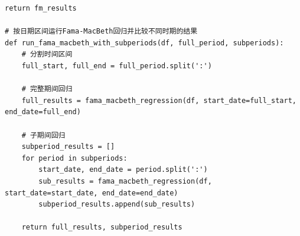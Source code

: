 \documentclass[12pt, a4paper]{article}
\begin{document}
\begin{lstlisting}[basicstyle=\small\ttfamily, breaklines=true, columns=fullflexible]
    return fm_results

# 按日期区间运行Fama-MacBeth回归并比较不同时期的结果
def run_fama_macbeth_with_subperiods(df, full_period, subperiods):
    # 分割时间区间
    full_start, full_end = full_period.split(':')
    
    # 完整期间回归
    full_results = fama_macbeth_regression(df, start_date=full_start, end_date=full_end)
    
    # 子期间回归
    subperiod_results = []
    for period in subperiods:
        start_date, end_date = period.split(':')
        sub_results = fama_macbeth_regression(df, start_date=start_date, end_date=end_date)
        subperiod_results.append(sub_results)
    
    return full_results, subperiod_results
\end{lstlisting}
\end{document}
